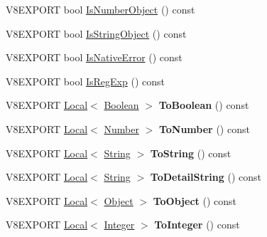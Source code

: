 \begin{DoxyCompactItemize}
V8\+E\+X\+P\+O\+R\+T bool \hyperlink{classv8_1_1_value_a2b4dd15e4135823a4bb1128a60c063cf}{Is\+Number\+Object} () const 
\item 
V8\+E\+X\+P\+O\+R\+T bool \hyperlink{classv8_1_1_value_a2ded13f1962fc1fa15eabc525fb433ee}{Is\+String\+Object} () const 
\item 
V8\+E\+X\+P\+O\+R\+T bool \hyperlink{classv8_1_1_value_a11293ed56e068b3bccdae482f2752f58}{Is\+Native\+Error} () const 
\item 
V8\+E\+X\+P\+O\+R\+T bool \hyperlink{classv8_1_1_value_a36ba10231b5aaf6c63d8589cd53c9a73}{Is\+Reg\+Exp} () const 
\item 
\hypertarget{classv8_1_1_value_adb0df6e857c07ae754b032307d3b5dbe}{}V8\+E\+X\+P\+O\+R\+T \hyperlink{classv8_1_1_local}{Local}$<$ \hyperlink{classv8_1_1_boolean}{Boolean} $>$ {\bfseries To\+Boolean} () const \label{classv8_1_1_value_adb0df6e857c07ae754b032307d3b5dbe}

\item 
\hypertarget{classv8_1_1_value_a8c1789ff6f8986d0ab2dfb807b20f6c5}{}V8\+E\+X\+P\+O\+R\+T \hyperlink{classv8_1_1_local}{Local}$<$ \hyperlink{classv8_1_1_number}{Number} $>$ {\bfseries To\+Number} () const \label{classv8_1_1_value_a8c1789ff6f8986d0ab2dfb807b20f6c5}

\item 
\hypertarget{classv8_1_1_value_a170ac861b877d846c4a5d4365d493dd9}{}V8\+E\+X\+P\+O\+R\+T \hyperlink{classv8_1_1_local}{Local}$<$ \hyperlink{classv8_1_1_string}{String} $>$ {\bfseries To\+String} () const \label{classv8_1_1_value_a170ac861b877d846c4a5d4365d493dd9}

\item 
\hypertarget{classv8_1_1_value_a5f1c2fff87d9b9b7f27a690f037df13a}{}V8\+E\+X\+P\+O\+R\+T \hyperlink{classv8_1_1_local}{Local}$<$ \hyperlink{classv8_1_1_string}{String} $>$ {\bfseries To\+Detail\+String} () const \label{classv8_1_1_value_a5f1c2fff87d9b9b7f27a690f037df13a}

\item 
\hypertarget{classv8_1_1_value_a5b604dcae6581adb11de6f4fad43d1db}{}V8\+E\+X\+P\+O\+R\+T \hyperlink{classv8_1_1_local}{Local}$<$ \hyperlink{classv8_1_1_object}{Object} $>$ {\bfseries To\+Object} () const \label{classv8_1_1_value_a5b604dcae6581adb11de6f4fad43d1db}

\item 
\hypertarget{classv8_1_1_value_a361a09e3647fc2c8048cc721f4b80b2d}{}V8\+E\+X\+P\+O\+R\+T \hyperlink{classv8_1_1_local}{Local}$<$ \hyperlink{classv8_1_1_integer}{Integer} $>$ {\bfseries To\+Integer} () const \label{classv8_1_1_value_a361a09e3647fc2c8048cc721f4b80b2d}


\end{DoxyCompactItemize}
